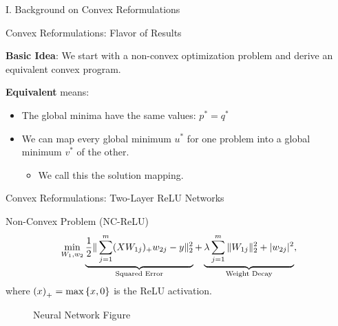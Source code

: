 \documentclass[usenames,dvipsnames,mathserif,notheorems]{beamer}
\newcommand{\bad}[1]{\textcolor{bad}{#1}}
\newcommand{\good}[1]{\textcolor{good}{#1}}
\def\showtikz{}
\begin{document}
\begin{frame}{}
	\begin{center}
		\huge I. Background on Convex Reformulations
	\end{center}
\end{frame}

\begin{frame}{Convex Reformulations: Flavor of Results}
	\large

	\textbf{Basic Idea}: We start with a \bad{non-convex} optimization problem and derive
	an equivalent \good{convex} program.

	\pause
	\vspace{2em}

	\textbf{Equivalent} means:
    \pause
	\vspace{0.5em}
	\begin{itemize}
		\item The global minima have the same values: \( p^* = q^* \)
		      \vspace{0.5em}
              \pause
		\item We can map every global minimum \( u^* \) for one problem into
		      a global minimum \( v^* \) of the other.
		      \vspace{0.5em}
              \pause

		      \begin{itemize}
			      \item We call this the \good{solution mapping}.
		      \end{itemize}
	\end{itemize}

\end{frame}


\begin{frame}{Convex Reformulations: Two-Layer ReLU Networks}

	{\large \bad{Non-Convex Problem} (NC-ReLU)}
	\[
		\min_{W_1, w_2} \underbrace{\frac 1 2 \|\sum_{j=1}^m (X W_{1j})_+ w_{2j} - y\|_2^2}_{\text{Squared Error}}
		+ \underbrace{\lambda \sum_{j=1}^m \|W_{1j}\|_2^2 + |w_{2j}|^2}_{\text{Weight Decay}},
	\]
	where \( \left(x\right)_+ = \max\left\{x, 0\right\} \) is the ReLU activation.
	\pause

	\begin{figure}[]
		\centering
		\ifdefined\showtikz
			
		\else
			\Huge Neural Network Figure
		\fi
	\end{figure}

\end{frame}
\end{document}
